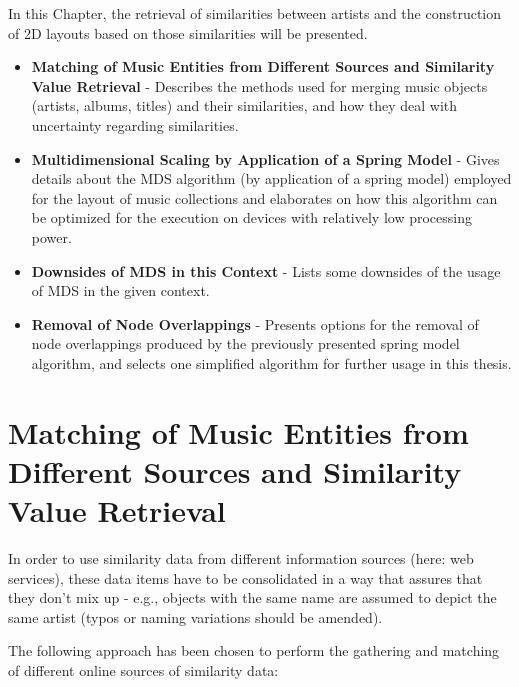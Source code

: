In this Chapter, the retrieval of similarities between artists and the construction of 2D layouts based on those similarities will be presented.

\begin{itemize}
	\item \textbf {Matching of Music Entities from Different Sources and Similarity Value Retrieval} - Describes the methods used for merging music objects (artists, albums, titles) and their similarities, and how they deal with uncertainty regarding similarities.
	\item \textbf {Multidimensional Scaling by Application of a Spring Model} - Gives details about the MDS algorithm (by application of a spring model) employed for the layout of music collections and elaborates on how this algorithm can be optimized for the execution on devices with relatively low processing power.
	\item \textbf {Downsides of MDS in this Context} - Lists some downsides of the usage of MDS in the given context.
	\item \textbf {Removal of Node Overlappings} - Presents options for the removal of node overlappings produced by the previously presented spring model algorithm, and selects one simplified algorithm for further usage in this thesis.
\end{itemize}

\section{Matching of Music Entities from Different Sources and Similarity Value Retrieval}
\label{sec:matching-music-entities}

In order to use similarity data from different information sources (here: web services), these data items have to be consolidated in a way that assures that they don't mix up - e.g., objects with the same name are assumed to depict the same artist (typos or naming variations should be amended).

The following approach has been chosen to perform the gathering and matching of different online sources of similarity data:

